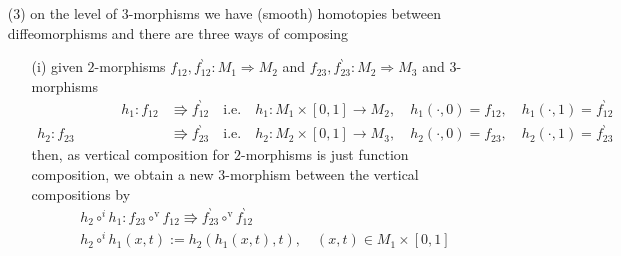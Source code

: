 \begin{enumerate}
\begin{enumerate}
\item[(3)]
on the level of $3$-morphisms we have (smooth) homotopies between diffeomorphisms and there are three ways of composing
\begin{enumerate}
\item[(i)]
given $2$-morphisms $f_{12},f_{12}^{\backprime} \colon M_{1} \Rightarrow M_{2}$ and $f_{23},f_{23}^{\backprime} \colon M_{2} \Rightarrow M_{3}$ and $3$-morphisms
\begin{align*}
\hspace{6em}
  h_{1}
  \colon
  f_{12}
  &\Rrightarrow
  f_{12}^{\backprime}
  \quad
  \text{i.e.}
  \quad
  h_{1}
  \colon
  M_{1}
  \times
  [0,1]
  \to
  M_{2}
  ,\quad
  h_{1}(\cdot,0)
  =
  f_{12}
  ,\quad
  h_{1}(\cdot,1)
  =
  f_{12}^{\backprime}
  \\
  h_{2}
  \colon
  f_{23}
  &\Rrightarrow
  f_{23}^{\backprime}
  \quad
  \text{i.e.}
  \quad
  h_{2}
  \colon
  M_{2}
  \times
  [0,1]
  \to
  M_{3}
  ,\quad
  h_{2}(\cdot,0)
  =
  f_{23}
  ,\quad
  h_{2}(\cdot,1)
  =
  f_{23}^{\backprime}
\end{align*}
then, as vertical composition for $2$-morphisms is just function composition, we obtain a new $3$-morphism between the vertical compositions by
\begin{align*}
  &
  h_{2}
  \circ^{i}
  h_{1}
  \colon
  f_{23}
  \circ^{\mathrm{v}}
  f_{12}
  \Rrightarrow
  f_{23}^{\backprime}
  \circ^{\mathrm{v}}
  f_{12}^{\backprime}
  \\
  &
  h_{2}
  \circ^{i}
  h_{1}
  (x,t)
  :=
  h_{2}(h_{1}(x,t),t)
  ,\quad
  (x,t)
  \in
  M_{1}
  \times
  [0,1]
\end{align*}


\end{enumerate}
\end{enumerate}
\end{enumerate}

